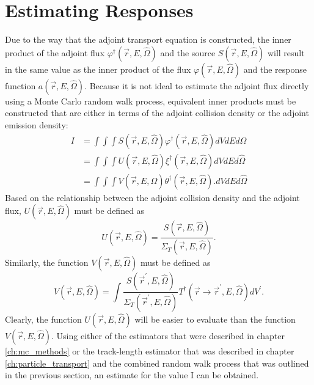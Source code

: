 \section{Estimating Responses}
Due to the way that the adjoint transport equation is constructed, the inner
product of the adjoint flux $\varphi^{\dagger}(\vec{r},E,\hat{\Omega})$ and the
source $S(\vec{r},E,\hat{\Omega})$ will result in the same value as the inner 
product of the flux $\varphi(\vec{r},E,\hat{\Omega})$ and the response
function $a(\vec{r},E,\hat{\Omega})$. Because it is not ideal to estimate the
adjoint flux directly using a Monte Carlo random walk process, equivalent
inner products must be constructed that are either in terms of the adjoint
collision density or the adjoint emission density:
\begin{align}
  I & = \int\int\int S(\vec{r},E,\hat{\Omega})\varphi^{\dagger}(\vec{r},E,\hat{\Omega})
  dV dE d\hat{\Omega} \\ 
  & = \int\int\int U(\vec{r},E,\hat{\Omega})\xi^{\dagger}(\vec{r},E,\hat{\Omega})
  dV dE d\hat{\Omega} \\
  & = \int\int\int V(\vec{r},E,\hat{\Omega})
  \theta^{\dagger}(\vec{r},E,\hat{\Omega}).
  dV dE d\hat{\Omega}
  \label{eq:adj_emission_ip}
\end{align}
Based on the relationship between the adjoint collision density and the
adjoint flux, $U(\vec{r},E,\hat{\Omega})$ must be defined as
\begin{equation}
  U(\vec{r},E,\hat{\Omega}) = \frac{S(\vec{r},E,\hat{\Omega})}
                                   {\Sigma_T(\vec{r},E,\hat{\Omega})}.
\end{equation}
Similarly, the function $V(\vec{r},E,\hat{\Omega})$ must be defined as
\begin{equation}
  V(\vec{r},E,\hat{\Omega}) = \int \frac{S(\vec{r}^{'},E,\hat{\Omega})}
  {\Sigma_T(\vec{r}^{'},E,\hat{\Omega})} 
  T^{\dagger}(\vec{r} \to \vec{r}^{'},E,\hat{\Omega}) dV^{'}.
\end{equation}
Clearly, the function $U(\vec{r},E,\hat{\Omega})$ will be easier to evaluate
than the function $V(\vec{r},E,\hat{\Omega})$. Using either of the estimators
that were described in chapter \ref{ch:mc_methods} or the track-length 
estimator that was described in chapter \ref{ch:particle_transport} and the 
combined random walk process that was outlined in the previous section, an 
estimate for the value I can be obtained. 


